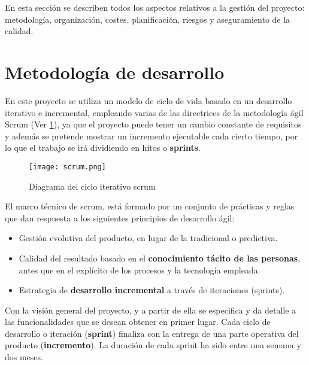 

En esta sección se describen todos los aspectos relativos a la gestión del proyecto: metodología, organización, costes, planificación, riesgos y aseguramiento de la calidad.

\section{Metodología de desarrollo}
En este proyecto se utiliza un modelo de ciclo de vida basado en un desarrollo iterativo e incremental, empleando varias de las directrices de la metodología ágil Scrum (Ver \ref{fig:scrum}), ya que el proyecto puede tener un cambio constante de requisitos y además se pretende mostrar un incremento ejecutable cada cierto tiempo, por lo que el trabajo se irá dividiendo en hitos o \textbf{sprints}.\\

\begin{figure}[h!]
  \texttt{[image: scrum.png]}
  \caption{Diagrama del ciclo iterativo scrum}
  \label{fig:scrum}
\end{figure}

El marco técnico de scrum, \cite{scrum2016} está formado por un conjunto de prácticas y reglas que dan respuesta a los siguientes principios de desarrollo ágil:
\begin{itemize}
	\item Gestión evolutiva del producto, en lugar de la tradicional o predictiva.
	\item Calidad del resultado basado en el \textbf{conocimiento tácito de las personas}, antes que en el explícito de los procesos y la tecnología empleada.
	\item Estrategia de \textbf{desarrollo incremental} a través de iteraciones (sprints).
\end{itemize}

Con la visión general del proyecto, y a partir de ella se especifica y da detalle a las funcionalidades que se desean obtener en primer lugar. Cada ciclo de desarrollo o iteración (\textbf{sprint}) finaliza con la entrega de una parte operativa del producto (\textbf{incremento}). La duración de cada sprint ha sido entre una semana y dos meses.\\

